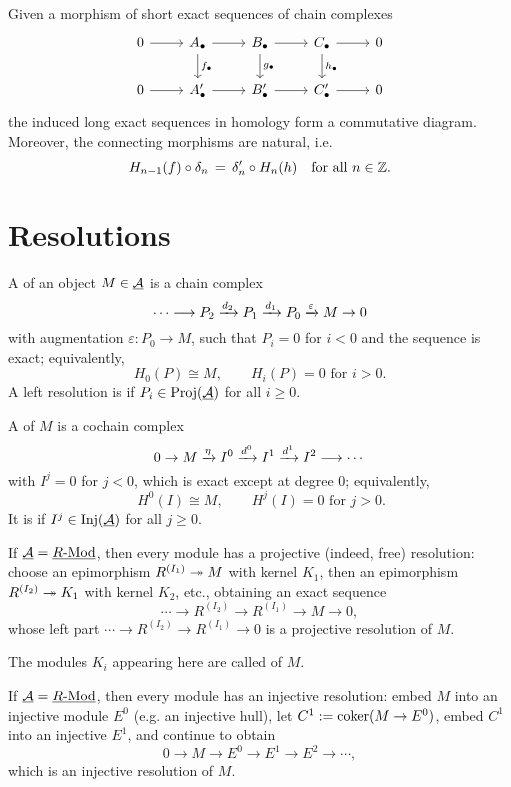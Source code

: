 \begin{proposition*}
	Given a morphism of short exact sequences of chain complexes
	\[
		\begin{tikzcd}
			0 \arrow[r] & A_{\bullet} \arrow[r] \arrow[d,"f_{\bullet}"] & B_{\bullet} \arrow[r] \arrow[d,"g_{\bullet}"] & C_{\bullet} \arrow[r] \arrow[d,"h_{\bullet}"] & 0 \\
			0 \arrow[r] & A'_{\bullet} \arrow[r] & B'_{\bullet} \arrow[r] & C'_{\bullet} \arrow[r] & 0
		\end{tikzcd}
	\]
	the induced long exact sequences in homology form a commutative diagram. Moreover, the connecting morphisms are natural, i.e.
	\[
		H_{n-1}(f) \circ \delta_n \,=\, \delta'_n \circ H_n(h) \quad \text{for all } n \in \mathbb{Z} .
	\]
\end{proposition*}

\section{Resolutions}

\begin{definitions*}
	\item A  of an object \( M \in \underline{\mathcal A} \) is a chain complex
		\[
			\dotsm \longrightarrow P_2 \xrightarrow{d_2} P_1 \xrightarrow{d_1} P_0 \xrightarrow{\varepsilon} M \to 0
		\]
		with augmentation \( \varepsilon: P_0 \to M \), such that \( P_i = 0 \) for \( i < 0 \) and the sequence is exact; equivalently,
		\[
			H_0(P) \cong M, \qquad H_i(P) = 0 \text{ for } i>0 .
		\]
		A left resolution is  if \( P_i \in \operatorname{Proj}(\underline{\mathcal A}) \) for all \( i \ge 0 \).
	\item A  of \( M \) is a cochain complex
		\[
			0 \to M \xrightarrow{\eta} I^0 \xrightarrow{d^0} I^1 \xrightarrow{d^1} I^2 \longrightarrow \dotsm
		\]
		with \( I^j = 0 \) for \( j<0 \), which is exact except at degree \( 0 \); equivalently,
		\[
			\ H^0(I) \cong M, \qquad H^j(I) = 0 \text{ for } j>0 .
		\]
		It is  if \( I^j \in \operatorname{Inj}(\underline{\mathcal A}) \) for all \( j \ge 0 \).
\end{definitions*}

\begin{examples*}
	\item If \( \underline{\mathcal A} = \underline{R\text{-}\mathrm{Mod}} \), then every module has a projective (indeed, free) resolution: choose an epimorphism \( R^{(I_1)} \twoheadrightarrow M \) with kernel \( K_1 \), then an epimorphism \( R^{(I_2)} \twoheadrightarrow K_1 \) with kernel \( K_2 \), etc., obtaining an exact sequence
		\[
			\dotsm \to R^{(I_2)} \to R^{(I_1)} \to M \to 0,
		\]
		whose left part \( \dotsm \to R^{(I_2)} \to R^{(I_1)} \to 0 \) is a projective resolution of \( M \).

	\item The modules \( K_i \) appearing here are called  of \( M \).
	\item If \( \underline{\mathcal A} = \underline{R\text{-}\mathrm{Mod}} \), then every module has an injective resolution: embed \( M \) into an injective module \( E^0 \) (e.g. an injective hull), let \( C^1 := \operatorname{coker}(M \to E^0) \), embed \( C^1 \) into an injective \( E^1 \), and continue to obtain
		\[
			0 \to M \to E^0 \to E^1 \to E^2 \to \dotsm,
		\]
		which is an injective resolution of \( M \).
\end{examples*}

